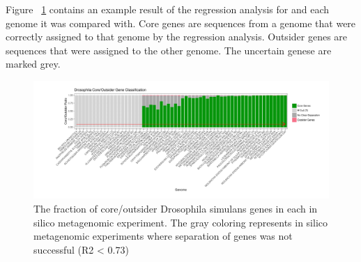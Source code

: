 Figure ~\ref{fig:rsquared_barplot} contains an example result of the regression
analysis for  and each genome it was compared with. Core genes are sequences from a
genome that were correctly assigned to that genome by the regression analysis.
Outsider genes are sequences that were assigned to the other genome. The
uncertain genese are marked grey.
\begin{center}
\begin{figure}
\includegraphics[width=12cm]{figures/core_outsider_barplot_bootstrapped.pdf}
\caption{The fraction of core/outsider Drosophila simulans genes in each in
silico metagenomic experiment. The gray coloring represents in silico
metagenomic experiments where separation of genes was not successful (R2 <
0.73)}
\label{fig:rsquared_barplot}
\end{figure}
\end{center}

